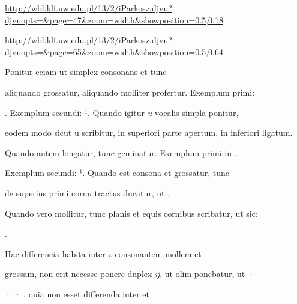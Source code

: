 

\newParkoszpage


{
\url{http://wbl.klf.uw.edu.pl/13/2/iParkosz.djvu?djvuopts=&page=47&zoom=width&showposition=0.5,0.18}

\url{http://wbl.klf.uw.edu.pl/13/2/iParkosz.djvu?djvuopts=&page=65&zoom=width&showposition=0.5,0.64}
}

\fullpreviouslines


{
\color{blue}
Ponitur eciam ut simplex consonans et tunc

}

\fulllines



aliquando grossatur, aliquando molliter profertur. Exemplum primi:  

. Exemplum secundi:  ¹. Quando igitur \textit{u} vocalis simpla ponitur, 

eodem modo sicut u scribitur, in superiori parte apertum, in inferiori ligatum. 

Quando autem longatur, tunc geminatur. Exemplum primi in  .



Exemplum secundi:  ¹. Quando est consona et grossatur, tunc

de superius primi cornu tractus ducatur, ut   .

Quando vero mollitur, tunc planis et equis cornibus scribatur, ut sic: 

\splitlines

 .

\indentK Hac differencia habita inter \textit{v} consonantem mollem et

\fulllines

grossam, non erit necesse ponere duplex \textit{ĳ}, ut olim ponebatur,  ut ·

· · , quia non esset differenda inter  et 

